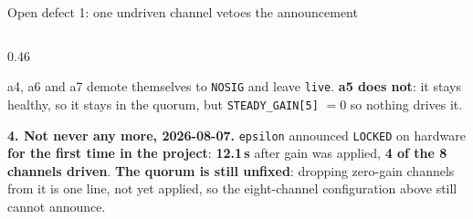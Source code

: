 \documentclass[aspectratio=169]{beamer}
\begin{document}
\begin{frame}{Open defect 1: one undriven channel vetoes the announcement}
\begin{columns}[T]
\begin{column}{0.46\textwidth}
      \vspace{1mm}
      \raggedright\scriptsize
      a4, a6 and a7 demote themselves to \texttt{NOSIG} and leave \texttt{live}.
      \textbf{a5 does not}: it stays healthy, so it stays in the quorum, but
      \texttt{STEADY\_GAIN[5]} $= 0$ so nothing drives it.

      \vspace{1.5mm}
      \textbf{4. Not never any more, 2026-08-07.} \texttt{epsilon} announced
      \texttt{LOCKED} on hardware \textbf{for the first time in the project}:
      \textbf{12.1\,s} after gain was applied, \textbf{4 of the 8 channels
      driven}. \textbf{The quorum is still unfixed}: dropping zero-gain channels
      from it is one line, not yet applied, so the eight-channel configuration
      above still cannot announce.
    \end{column}
  \end{columns}
\end{frame}
\end{document}
